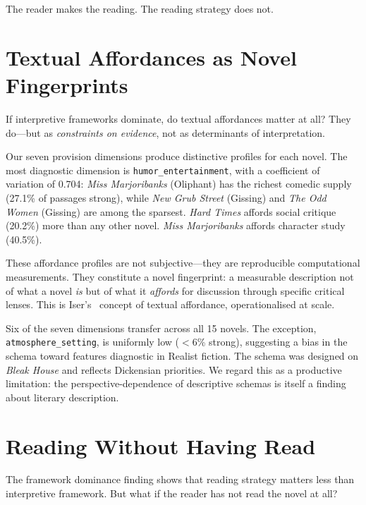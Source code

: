 \documentclass[final]{clv2025}
\begin{document}
The reader makes the reading.  The reading strategy does not.


\section{Textual Affordances as Novel Fingerprints}
\label{sec:affordance}

If interpretive frameworks dominate, do textual affordances matter at
all?  They do---but as \emph{constraints on evidence}, not as
determinants of interpretation.

Our seven provision dimensions produce distinctive profiles for each
novel.  The most diagnostic dimension is
\texttt{humor\_entertainment}, with a coefficient of variation of
0.704: \textit{Miss Marjoribanks} (Oliphant) has the richest comedic
supply (27.1\% of passages strong), while \textit{New Grub Street}
(Gissing) and \textit{The Odd Women} (Gissing) are among the sparsest.
\textit{Hard Times} affords social critique (20.2\%) more than any
other novel.  \textit{Miss Marjoribanks} affords character study
(40.5\%).

These affordance profiles are not subjective---they are reproducible
computational measurements.  They constitute a novel fingerprint: a
measurable description not of what a novel \emph{is} but of what it
\emph{affords} for discussion through specific critical lenses.  This is
Iser's~\cite{iser1978act} concept of textual affordance, operationalised
at scale.

Six of the seven dimensions transfer across all 15 novels.  The
exception, \texttt{atmosphere\_setting}, is uniformly low ($<$6\%
strong), suggesting a bias in the schema toward features diagnostic in
Realist fiction.  The schema was designed on \textit{Bleak House} and
reflects Dickensian priorities.  We regard this as a productive
limitation: the perspective-dependence of descriptive schemas is itself
a finding about literary description.


\section{Reading Without Having Read}
\label{sec:grounding}

The framework dominance finding shows that reading strategy matters less than
interpretive framework.  But what if the reader has not read the novel
at all?
\end{document}
